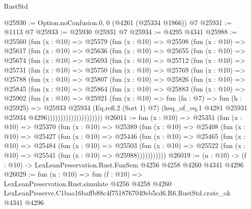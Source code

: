 \begin{lexlean}{RustStd}
\begin{coremodule}
@25930 := Option.noConfusion.{0, 0} (@4261 (@25334 @1866)) @7
@25931 := @1113 @7
@25933 := @25930 @25931 @7
@25934 := @4295 @4341
@25988 := @25560
    (fun (x : @10) =>
    @25579
      (fun (x : @10) =>
      @25598
        (fun (x : @10) =>
        @25617
          (fun (x : @10) =>
          @25636
            (fun (x : @10) =>
            @25655
              (fun (x : @10) =>
              @25674
                (fun (x : @10) =>
                @25693
                  (fun (x : @10) =>
                  @25712
                    (fun (x : @10) =>
                    @25731
                      (fun (x : @10) =>
                      @25750
                        (fun (x : @10) =>
                        @25769
                          (fun (x : @10) =>
                          @25788
                            (fun (x : @10) =>
                            @25807
                              (fun (x : @10) =>
                              @25826
                                (fun (x : @10) =>
                                @25845
                                  (fun (x : @10) =>
                                  @25864
                                    (fun (x : @10) =>
                                    @25883
                                      (fun (x : @10) =>
                                      @25902
                                        (fun (x : @10) =>
                                        @25921
                                          (fun (x : @10) =>
                                          fun (fn : @7) =>
                                          fun (h : @25925) =>
                                          @25933
                                            @25934
                                            (Eq.refl.{2} (Sort 1) @7)
                                            (heq_of_eq.{1}
                                              @4281
                                              @25931
                                              @25934
                                              @4296)))))))))))))))))))))
@26011 := fun (x : @10) =>
  @25351
    (fun (x : @10) =>
    @25370
      (fun (x : @10) =>
      @25389
        (fun (x : @10) =>
        @25408
          (fun (x : @10) =>
          @25427
            (fun (x : @10) =>
            @25446
              (fun (x : @10) =>
              @25465
                (fun (x : @10) =>
                @25484
                  (fun (x : @10) =>
                  @25503
                    (fun (x : @10) =>
                    @25522 (fun (x : @10) => @25541 (fun (x : @10) => @25988)))))))))))
@26019 := (n : @10) -> (f : @10) -> LexLeanPreservation.Rust.FunSem @4256 @4258 @4260 @4341 @4296
@26029 := fun (n : @10) =>
  fun (f : @10) =>
  LexLeanPreservation.Rust.simulate
    @4256
    @4258
    @4260
    LexLeanPreserve.C1baa16baffb88c4f7518767049eb5cd6.R6.RustStd.crate_ok
    @4341
    @4296
\end{coremodule}
\end{lexlean}
